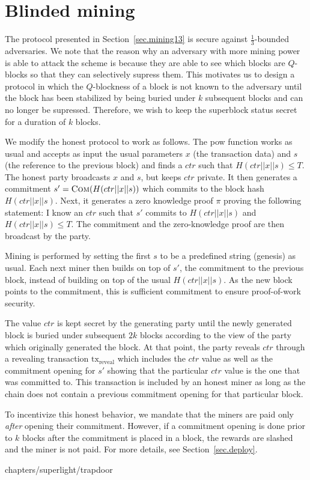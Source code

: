 \section{Blinded mining}

The protocol presented in Section~\ref{sec.mining13} is secure against
$\frac{1}{3}$-bounded adversaries. We note that the reason why an adversary with more
mining power is able to attack the scheme is because they are able to see which
blocks are $Q$-blocks so that they can selectively supress them. This motivates
us to design a protocol in which the $Q$-blockness of a block is not known to
the adversary until the block has been stabilized by being buried under $k$
subsequent blocks and can no longer be supressed. Therefore, we wish to keep
the superblock status secret for a duration of $k$ blocks.

We modify the honest protocol to work as follows. The \textsf{pow} function
works as usual and accepts as input the usual parameters $x$ (the transaction
data) and $s$ (the reference to the previous block) and finds a $ctr$ such that
$H(ctr || x || s) \leq T$. The honest party broadcasts $x$ and $s$, but keeps
$ctr$ private. It then generates a commitment $s' = \textsc{Com}(H(ctr || x ||
s))$ which commits to the block hash $H(ctr || x || s)$. Next, it generates a
zero knowledge proof $\pi$ proving the following statement: I know an $ctr$ such
that $s'$ commits to $H(ctr || x || s)$  and $H(ctr || x || s) \leq T$. The
commitment and the zero-knowledge proof are then broadcast by the party.

Mining is performed by setting the first $s$ to be a predefined string (genesis)
as usual. Each next miner then builds on top of $s'$, the commitment to the
previous block, instead of building on top of the usual $H(ctr || x || s)$. As
the new block points to the commitment, this is sufficient commitment to ensure
proof-of-work security.

The value $ctr$ is kept secret by the generating party until the newly generated
block is buried under subsequent $2k$ blocks according to the view of the party
which originally generated the block. At that point, the party reveals $ctr$
through a revealing transaction $\text{tx}_\text{reveal}$ which includes the
$ctr$ value as well as the commitment opening for $s'$ showing that the
particular $ctr$ value is the one that was committed to. This transaction is
included by an honest miner as long as the chain does not contain a previous
commitment opening for that particular block.

To incentivize this honest behavior, we mandate that the miners are paid only
\emph{after} opening their commitment. However, if a commitment opening is done
prior to $k$ blocks after the commitment is placed in a block, the rewards are
slashed and the miner is not paid. For more details, see
Section~\ref{sec.deploy}.

{chapters/superlight/trapdoor}
